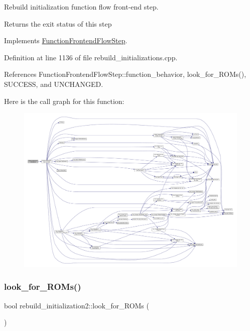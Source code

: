 Rebuild initialization function flow front-\/end step. 

\begin{DoxyReturn}{Returns}
the exit status of this step 
\end{DoxyReturn}


Implements \hyperlink{classFunctionFrontendFlowStep_a00612f7fb9eabbbc8ee7e39d34e5ac68}{Function\+Frontend\+Flow\+Step}.



Definition at line 1136 of file rebuild\+\_\+initializations.\+cpp.



References Function\+Frontend\+Flow\+Step\+::function\+\_\+behavior, look\+\_\+for\+\_\+\+R\+O\+Ms(), S\+U\+C\+C\+E\+SS, and U\+N\+C\+H\+A\+N\+G\+ED.

Here is the call graph for this function\+:
\nopagebreak
\begin{figure}[H]
\begin{center}
\leavevmode
\includegraphics[width=350pt]{db/df3/classrebuild__initialization2_ab0a55d5d212cac19ff646a5ca54deab6_cgraph}
\end{center}
\end{figure}
\mbox{\label{classrebuild__initialization2_a677aa83a6003323f11929da9609b7344}} 
\subsubsection{\texorpdfstring{look\+\_\+for\+\_\+\+R\+O\+Ms()}{look\_for\_ROMs()}}
{\footnotesize\ttfamily bool rebuild\+\_\+initialization2\+::look\+\_\+for\+\_\+\+R\+O\+Ms (\begin{DoxyParamCaption}{ }\end{DoxyParamCaption})\hspace{0.3cm}{\ttfamily [private]}}



